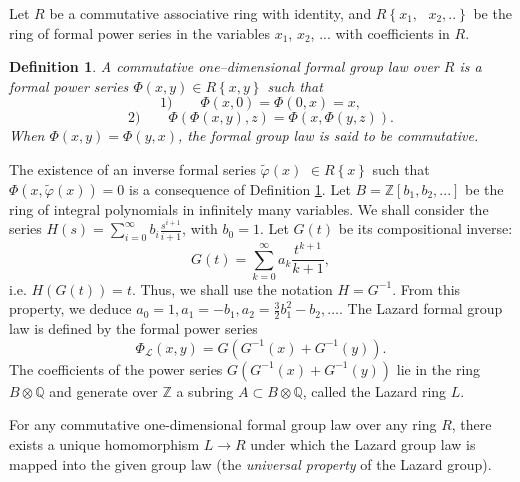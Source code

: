 \documentclass[10pt]{amsart}
\newcommand{\beq}{\begin{equation}}
\newcommand{\eeq}{\end{equation}}
\newtheorem{definition}{Definition}
\theoremstyle{definition}
\theoremstyle{definition}	 %
\begin{document}
Let $R$ be a commutative associative ring  with identity, and $R\left\{ x_{1},\text{ }%
x_{2},..\right\} $ be the ring of formal power series in the variables $x_{1}$, $x_{2}$,
... with coefficients in $R$.

\begin{definition} \label{formalgrouplaw}
A commutative one--dimensional formal group law
over $R$ is a formal power series $\Phi \left( x,y\right) \in R\left\{
x,y\right\} $ such that \cite{Bochner1946}
\begin{equation*} \label{compositionlaw}
1)\qquad \Phi \left( x,0\right) =\Phi \left( 0,x\right) =x,
\end{equation*}%
\begin{equation*}
2)\qquad \Phi \left( \Phi \left( x,y\right) ,z\right) =\Phi \left( x,\Phi
\left( y,z\right) \right) \text{.}
\end{equation*}
When $\Phi \left( x,y\right) =\Phi \left( y,x\right) $, the formal group law is
said to be commutative.
\end{definition}
The existence of an inverse formal series $\tilde{\varphi}
\left( x\right) $ $\in R\left\{ x\right\} $ such that $\Phi \left( x,\tilde{\varphi}
\left( x\right) \right) =0$ is a consequence of Definition \ref{formalgrouplaw}. Let  $B=\mathbb{Z}[b_{1},b_{2},...]$ be the  ring of integral polynomials in infinitely many variables. We shall consider the series $
H\left( s\right) = \sum_{i=0}^{\infty} b_i \frac{s^{i+1}}{i+1}$,
with $b_0=1$. Let $G\left( t\right)$ be its compositional inverse:
\beq \label{I.2}
G\left( t\right) =\sum_{k=0}^{\infty} a_k \frac{t^{k+1}}{k+1},
\eeq
 i.e. $H\left( G\left( t\right) \right) =t$. Thus, we shall use the notation $H=G^{-1}$. From this property, we deduce $a_{0}=1, a_{1}=-b_1, a_2= \frac{3}{2} b_1^2 -b_2,\ldots$.
The Lazard formal group law \cite{Haze} is defined by the formal power series
\[
\Phi_{\mathcal{L}} \left(x, y\right) =G\left( G^{-1}\left(
x\right) +G^{-1}\left(y\right) \right).
\]
The coefficients of the power series $G\left( G^{-1}\left( x\right) +G^{-1}\left(y\right) \right)$ lie in the ring $B \otimes \mathbb{Q}$ and generate over $\mathbb{Z}$ a subring $A \subset B \otimes \mathbb{Q}$, called the Lazard ring $L$.

For any commutative one-dimensional formal group law over any ring $R$, there exists a unique homomorphism $L\to R$ under which the Lazard group law is mapped into the given group law (the \textit{universal property} of the Lazard group).
\end{document}
